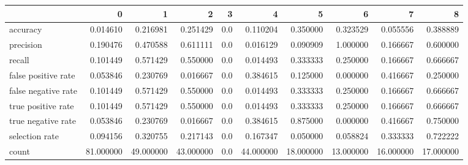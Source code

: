 \begin{tabular}{lrrrrrrrrr}
\toprule
{} &          0 &          1 &          2 &    3 &          4 &          5 &          6 &          7 &          8 \\
\midrule
accuracy            &   0.014610 &   0.216981 &   0.251429 &  0.0 &   0.110204 &   0.350000 &   0.323529 &   0.055556 &   0.388889 \\
precision           &   0.190476 &   0.470588 &   0.611111 &  0.0 &   0.016129 &   0.090909 &   1.000000 &   0.166667 &   0.600000 \\
recall              &   0.101449 &   0.571429 &   0.550000 &  0.0 &   0.014493 &   0.333333 &   0.250000 &   0.166667 &   0.666667 \\
false positive rate &   0.053846 &   0.230769 &   0.016667 &  0.0 &   0.384615 &   0.125000 &   0.000000 &   0.416667 &   0.250000 \\
false negative rate &   0.101449 &   0.571429 &   0.550000 &  0.0 &   0.014493 &   0.333333 &   0.250000 &   0.166667 &   0.666667 \\
true positive rate  &   0.101449 &   0.571429 &   0.550000 &  0.0 &   0.014493 &   0.333333 &   0.250000 &   0.166667 &   0.666667 \\
true negative rate  &   0.053846 &   0.230769 &   0.016667 &  0.0 &   0.384615 &   0.875000 &   0.000000 &   0.416667 &   0.750000 \\
selection rate      &   0.094156 &   0.320755 &   0.217143 &  0.0 &   0.167347 &   0.050000 &   0.058824 &   0.333333 &   0.722222 \\
count               &  81.000000 &  49.000000 &  43.000000 &  0.0 &  44.000000 &  18.000000 &  13.000000 &  16.000000 &  17.000000 \\
\bottomrule
\end{tabular}
